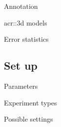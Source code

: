 \documentclass[12pt]{beamer}
\begin{document}
\begin{frame}{Annotation}
{                }
            \end{frame}

            \begin{frame}{\texorpdfstring{\acrshort*{acr::3d}}{3D} models}
                
            \end{frame}

            \begin{frame}{Error statistics}
                \centering
            \end{frame}
        
        \subsection{Set up}
            \begin{frame}{Parameters}
                
            \end{frame}

            \begin{frame}{Experiment types}
                \centering
                
            \end{frame}

            \begin{frame}{Possible settings}
                
            \end{frame}
        
\end{document}
